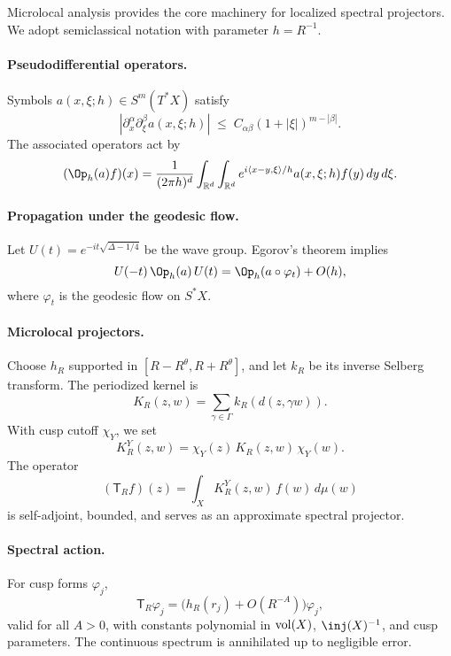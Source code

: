 Microlocal analysis provides the core machinery for localized spectral projectors.  
We adopt semiclassical notation with parameter $h=R^{-1}$.

\paragraph{Pseudodifferential operators.}
Symbols $a(x,\xi;h)\in S^m(T^*X)$ satisfy
\begin{equation}\label{eq:symbol}
  |\partial_x^\alpha\partial_\xi^\beta a(x,\xi;h)|
  \;\le\; C_{\alpha\beta}(1+|\xi|)^{m-|\beta|}.
\end{equation}
The associated operators act by
\begin{equation}\label{eq:pdo}
  (\Op_h(a)f)(x) = \frac{1}{(2\pi h)^d}
  \int_{\RR^d}\int_{\RR^d} e^{i\langle x-y,\xi\rangle/h}a(x,\xi;h)f(y)\,dy\,d\xi.
\end{equation}

\paragraph{Propagation under the geodesic flow.}
Let $U(t) = e^{-it\sqrt{\Delta-1/4}}$ be the wave group.  
Egorov’s theorem implies
\begin{equation}\label{eq:egorov}
  U(-t)\,\Op_h(a)\,U(t) = \Op_h(a\circ \varphi_t) + O(h),
\end{equation}
where $\varphi_t$ is the geodesic flow on $S^*X$.

\paragraph{Microlocal projectors.}
Choose $h_R$ supported in $[R-R^\theta,R+R^\theta]$, and let $k_R$ be its inverse Selberg transform.  
The periodized kernel is
\begin{equation}\label{eq:kernel-KR}
  K_R(z,w) = \sum_{\gamma\in\Gamma} k_R(d(z,\gamma w)).
\end{equation}
With cusp cutoff $\chi_Y$, we set
\begin{equation}\label{eq:kernel-KRY}
  K_R^Y(z,w) = \chi_Y(z)\,K_R(z,w)\,\chi_Y(w).
\end{equation}
The operator
\begin{equation}\label{eq:TR}
  (\mathsf{T}_R f)(z) = \int_X K_R^Y(z,w)\,f(w)\,d\mu(w)
\end{equation}
is self-adjoint, bounded, and serves as an approximate spectral projector.

\paragraph{Spectral action.}
For cusp forms $\varphi_j$,
\begin{equation}\label{eq:TR-action}
  \mathsf{T}_R\varphi_j = \big(h_R(r_j)+O(R^{-A})\big)\varphi_j,
\end{equation}
valid for all $A>0$, with constants polynomial in $\operatorname{vol}(X)$, $\inj(X)^{-1}$, and cusp parameters.  
The continuous spectrum is annihilated up to negligible error.

